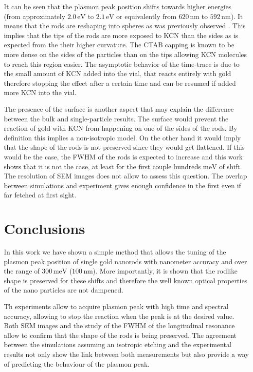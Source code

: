 \documentclass{article}
\begin{document}
It can be seen that the plasmon peak position shifts towards higher energies
(from approximately $2.0\,\textrm{eV}$ to $2.1\,\textrm{eV}$ or equivalently
from $620\,\textrm{nm}$ to $592\,\textrm{nm}$). It means that the rods are
reshaping into spheres as was previously observed \cite{Jana2002}. This implies
that the tips of the rods are more exposed to KCN than the sides as is expected
from the their higher curvature. The CTAB capping is known to be more dense on
the sides of the particles than on the tips allowing KCN molecules to reach this
region easier. The asymptotic behavior of the time-trace is due to the small
amount of KCN added into the vial, that reacts entirely with gold therefore
stopping the effect after a certain time and can be resumed if added more KCN
into the vial.

The presence of the surface is another aspect that may explain the difference
between the bulk and single-particle results. The surface would prevent the
reaction of gold with KCN from happening on one of the sides of the rods. By
definition this implies a non-isotropic model. On the other hand it would imply
that the shape of the rods is not preserved since they would get flattened. If
this would be the case, the FWHM of the rods is expected to increase and this
work shows that it is not the case, at least for the first couple
hundreds $\textrm{meV}$ of shift. The resolution of SEM images does not allow to
assess this question. The overlap between simulations and experiment gives
enough confidence in the first even if far fetched at first sight.




\section{Conclusions}
In this work we have shown a simple method that allows the tuning of the plasmon
peak position of single gold nanorods with nanometer accuracy and over the range
of $300\,\textrm{meV}$ ($100\,\textrm{nm}$). More importantly, it is shown that
the rodlike shape is preserved for these shifts and therefore the well known
optical properties of the nano particles are not dampened. 

Th experiments allow to acquire plasmon peak with high time and spectral
accuracy, allowing to stop the reaction when the peak is at the desired value.
Both SEM images and the study of the FWHM of the longitudinal resonance allow to
confirm that the shape of the rods is being preserved. The agreement between the
simulations assuming an isotropic etching and the experimental results not only
show the link between both measurements but also provide a way of predicting the
behaviour of the plasmon peak. 
\end{document}
